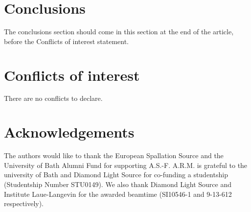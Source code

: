 \documentclass[twoside,twocolumn,9pt]{article}
\renewcommand{\refname}{Notes and references}
\begin{document}
\section{Conclusions}
The conclusions section should come in this section at the end of the article, before the Conflicts of interest statement.

\section*{Conflicts of interest}
There are no conflicts to declare.

\section*{Acknowledgements}
The authors would like to thank the European Spallation Source and the University of Bath Alumni Fund for supporting A.S.-F. A.R.M. is grateful to the university of Bath and Diamond Light Source for co-funding a studentship (Studentship Number STU0149). We also thank Diamond Light Source and Institute Laue-Langevin for the awarded beamtime (SI10546-1 and 9-13-612 respectively).



\balance


\end{document}
